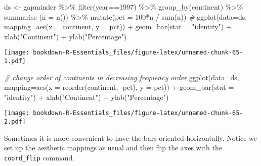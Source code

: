 \documentclass[
]{book}
\newenvironment{Shaded}{\begin{snugshade}}{\end{snugshade}}
\newcommand{\AttributeTok}[1]{\textcolor[rgb]{0.77,0.63,0.00}{#1}}
\newcommand{\CommentTok}[1]{\textcolor[rgb]{0.56,0.35,0.01}{\textit{#1}}}
\newcommand{\DecValTok}[1]{\textcolor[rgb]{0.00,0.00,0.81}{#1}}
\newcommand{\FunctionTok}[1]{\textcolor[rgb]{0.00,0.00,0.00}{#1}}
\newcommand{\NormalTok}[1]{#1}
\newcommand{\OtherTok}[1]{\textcolor[rgb]{0.56,0.35,0.01}{#1}}
\newcommand{\SpecialCharTok}[1]{\textcolor[rgb]{0.00,0.00,0.00}{#1}}
\newcommand{\StringTok}[1]{\textcolor[rgb]{0.31,0.60,0.02}{#1}}
\begin{document}
\begin{Shaded}
\begin{Highlighting}[]
\NormalTok{ds }\OtherTok{\textless{}{-}}\NormalTok{ gapminder }\SpecialCharTok{\%\textgreater{}\%} 
  \FunctionTok{filter}\NormalTok{(year}\SpecialCharTok{==}\DecValTok{1997}\NormalTok{) }\SpecialCharTok{\%\textgreater{}\%} 
  \FunctionTok{group\_by}\NormalTok{(continent)  }\SpecialCharTok{\%\textgreater{}\%}
  \FunctionTok{summarise}\NormalTok{ (}\AttributeTok{n =} \FunctionTok{n}\NormalTok{()) }\SpecialCharTok{\%\textgreater{}\%}
  \FunctionTok{mutate}\NormalTok{(}\AttributeTok{pct =} \DecValTok{100}\SpecialCharTok{*}\NormalTok{n }\SpecialCharTok{/} \FunctionTok{sum}\NormalTok{(n)) }
\CommentTok{\#}
\FunctionTok{ggplot}\NormalTok{(}\AttributeTok{data=}\NormalTok{ds, }\AttributeTok{mapping=}\FunctionTok{aes}\NormalTok{(}\AttributeTok{x =}\NormalTok{ continent, }\AttributeTok{y =}\NormalTok{ pct)) }\SpecialCharTok{+} 
  \FunctionTok{geom\_bar}\NormalTok{(}\AttributeTok{stat =} \StringTok{"identity"}\NormalTok{) }\SpecialCharTok{+} 
  \FunctionTok{xlab}\NormalTok{(}\StringTok{"Continent"}\NormalTok{) }\SpecialCharTok{+} \FunctionTok{ylab}\NormalTok{(}\StringTok{"Percentage"}\NormalTok{)}
\end{Highlighting}
\end{Shaded}

\texttt{[image: bookdown-R-Essentials\_files/figure-latex/unnamed-chunk-65-1.pdf]}

\begin{Shaded}
\begin{Highlighting}[]
\CommentTok{\# change order of continents in decreasing frequency order}
\FunctionTok{ggplot}\NormalTok{(}\AttributeTok{data=}\NormalTok{ds, }\AttributeTok{mapping=}\FunctionTok{aes}\NormalTok{(}\AttributeTok{x =} \FunctionTok{reorder}\NormalTok{(continent, }\SpecialCharTok{{-}}\NormalTok{pct), }\AttributeTok{y =}\NormalTok{ pct)) }\SpecialCharTok{+} 
  \FunctionTok{geom\_bar}\NormalTok{(}\AttributeTok{stat =} \StringTok{"identity"}\NormalTok{) }\SpecialCharTok{+} 
  \FunctionTok{xlab}\NormalTok{(}\StringTok{"Continent"}\NormalTok{) }\SpecialCharTok{+} \FunctionTok{ylab}\NormalTok{(}\StringTok{"Percentage"}\NormalTok{)}
\end{Highlighting}
\end{Shaded}

\texttt{[image: bookdown-R-Essentials\_files/figure-latex/unnamed-chunk-65-2.pdf]}

Sometimes it is more convenient to have the bars oriented horizontally. Notice we set up the aesthetic mappings as usual and then flip the axes with the \texttt{coord\_flip} command.
\end{document}
